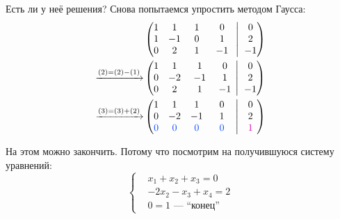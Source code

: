 \documentclass[a4paper,12pt]{article}
\newcommand{\BigMiddleThree}{\;\left|\vphantom{\begin{pmatrix} 0\\0\\0 \end{pmatrix}}\right.\;}
\newcommand{\lrhph}[2]{\hphantom{\makebox[#2][l]{}}#1\hphantom{\makebox[#2][l]{}}}
\begin{document}
  Есть ли у неё решения?
  Снова попытаемся упростить методом Гаусса:
  \begin{equation*}
  \begin{split}
    &\left(
      \begin{matrix}
        1 & 1 & \lrhph{1}{4pt} & \lrhph{0}{7pt}\\
        1 & -1 & 0 & 1\\
        0 & 2 & 1 & -1
      \end{matrix}
      \BigMiddleThree
      \begin{matrix}
        0\\
        2\\
        -1
      \end{matrix}
    \right)\\
    \xrightarrow{(2) = (2) - (1)} &\left(
      \begin{matrix}
        1 & 1 & 1 & 0\\
        0 & -2 & -1 & 1\\
        0 & 2 & \lrhph{1}{7pt} & {-1}
      \end{matrix}
      \BigMiddleThree
      \begin{matrix}
        0\\
        2\\
        -1
      \end{matrix}
    \right)\\
    \xrightarrow{(3) = (3) + (2)} &\left(
      \begin{matrix}
        1 & 1 & 1 & 0\\
        0 & -2 & -1 & 1\\
        \textcolor{blue}{0} & \textcolor{blue}{0} & \textcolor{blue}{0} & \lrhph{\textcolor{blue}{0}}{7pt}
      \end{matrix}
      \BigMiddleThree
      \begin{matrix}
        0\\
        2\\
        \lrhph{\textcolor{pink}{1}}{4pt}
      \end{matrix}
    \right)
  \end{split}
  \end{equation*}

  На этом можно закончить.
  Потому что посмотрим на получившуюся систему уравнений:
  \[
    \left\{
      \begin{aligned}
        &x_1 + x_2 + x_3 = 0\\
        &-2x_2 - x_3 + x_4 = 2\\
        &\boxed{0 = 1} \mbox{\ ---~``конец''}
      \end{aligned}
    \right.
  \]
\end{document}

